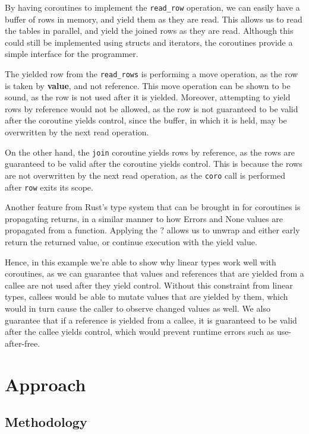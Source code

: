 \documentclass[review,twocolumn,preprint]{sigplanconf}
\begin{document}
By having coroutines to implement the \verb!read_row! operation, we can easily have a buffer of rows in memory, and yield them as they are read. This allows us to read the tables in parallel, and yield the joined rows as they are read. Although this could still be implemented using structs and iterators, the coroutines provide a simple interface for the programmer.

The yielded row from the \verb!read_rows! is performing a move operation, as the row is taken by \textbf{value}, and not reference. This move operation can be shown to be sound, as the row is not used after it is yielded. Moreover, attempting to yield rows by reference would not be allowed, as the row is not guaranteed to be valid after the coroutine yields control, since the buffer, in which it is held, may be overwritten by the next read operation.

On the other hand, the \verb!join! coroutine yields rows by reference, as the rows are guaranteed to be valid after the coroutine yields control. This is because the rows are not overwritten by the next read operation, as the \verb!coro! call is performed after \verb!row! exits its scope.

Another feature from Rust's type system that can be brought in for coroutines is propagating returns, in a similar manner to how Errors and None values are propagated from a function. Applying the $?$ allows us to unwrap and either early return the returned value, or continue execution with the yield value.

Hence, in this example we're able to show why linear types work well with coroutines, as we can guarantee that values and references that are yielded from a callee are not used after they yield control. Without this constraint from linear types, callees would be able to mutate values that are yielded by them, which would in turn cause the caller to observe changed values as well. We also guarantee that if a reference is yielded from a callee, it is guaranteed to be valid after the callee yields control, which would prevent runtime errors such as use-after-free.

\section{Approach}

\subsection{Methodology}
\end{document}
